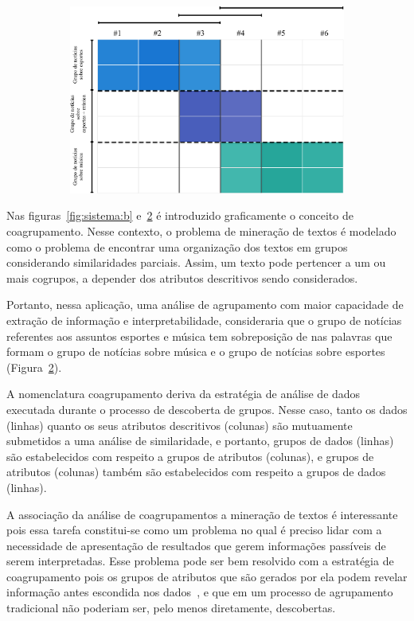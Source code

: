 \documentclass[
    12pt,                %
    oneside,            %
    a4paper,            %
    english,            %
    brazil                %
    ]{abntex2ppgsi}
\begin{document}
\begin{figure} [htpb]
\begin{subfigure}[b]{0.45\textwidth}
        \includegraphics[width=\textwidth]{img/sistema2.png}
        \caption{}
        \label{fig:sistema:c}
    \end{subfigure}
\end{figure}

Nas figuras~\ref{fig:sistema:b} e~\ref{fig:sistema:c} é introduzido graficamente o conceito de coagrupamento.
Nesse contexto, o problema de mineração de textos é modelado como o problema de encontrar uma organização dos textos em grupos considerando similaridades parciais.
Assim, um texto pode pertencer a um ou mais cogrupos, a depender dos atributos descritivos sendo considerados.

Portanto, nessa aplicação, uma análise de agrupamento com maior capacidade de extração de informação e interpretabilidade, consideraria que o grupo de notícias referentes aos assuntos esportes e música tem sobreposição de nas palavras que formam o grupo de notícias sobre música e o grupo de notícias sobre esportes (Figura~\ref{fig:sistema:c}).

A nomenclatura coagrupamento deriva da estratégia de análise de dados executada durante o processo de descoberta de grupos.
Nesse caso, tanto os dados (linhas) quanto os seus atributos descritivos (colunas) são mutuamente submetidos a uma análise de similaridade, e portanto, grupos de dados (linhas) são estabelecidos com respeito a grupos de atributos (colunas), e grupos de atributos (colunas) também são estabelecidos com respeito a grupos de dados (linhas).

A associação da análise de coagrupamentos a mineração de textos é interessante pois essa tarefa constitui-se como um problema no qual é preciso lidar com a necessidade de apresentação de resultados que gerem informações passíveis de serem interpretadas.
Esse problema pode ser bem resolvido com a estratégia de coagrupamento pois os grupos de atributos que são gerados por ela podem revelar informação antes escondida nos dados~\cite{Tjhi2009}, e que em um processo de agrupamento tradicional não poderiam ser, pelo menos diretamente, descobertas.
\end{document}
